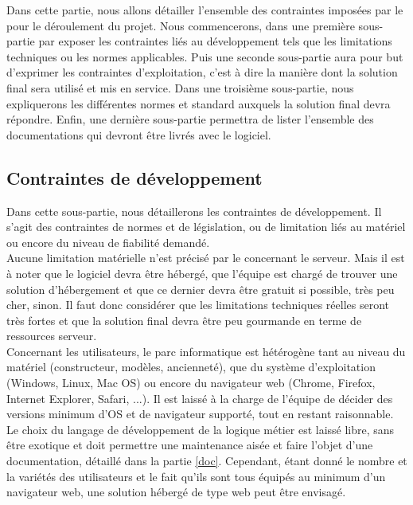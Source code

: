 Dans cette partie, nous allons détailler l'ensemble des contraintes imposées par le \client{} pour le déroulement du projet. Nous commencerons, dans une première sous-partie par exposer les contraintes liés au développement tels que les limitations techniques ou les normes applicables. Puis une seconde sous-partie aura pour but d'exprimer les contraintes d'exploitation, c'est à dire la manière dont la solution final sera utilisé et mis en service. Dans une troisième sous-partie, nous expliquerons les différentes normes et standard auxquels la solution final devra répondre. Enfin, une dernière sous-partie permettra de lister l'ensemble des documentations qui devront être livrés avec le logiciel.


\subsection{Contraintes de développement}
Dans cette sous-partie, nous détaillerons les contraintes de développement. Il s'agit des contraintes de normes et de législation, ou de limitation liés au matériel ou encore du niveau de fiabilité demandé.\\


Aucune limitation matérielle n'est précisé par le \client{} concernant le serveur. Mais il est à noter que le logiciel devra être hébergé, que l'équipe \PICCourt{} est chargé de trouver une solution d'hébergement et que ce dernier devra être gratuit si possible, très peu cher, sinon. Il faut donc considérer que les limitations techniques réelles seront très fortes et que la solution final devra être peu gourmande en terme de ressources serveur.\\

Concernant les utilisateurs, le parc informatique est hétérogène tant au niveau du matériel (constructeur, modèles, ancienneté), que du système d'exploitation (Windows, Linux, Mac OS) ou encore du navigateur web (Chrome, Firefox, Internet Explorer, Safari, ...). Il est laissé à la charge de l'équipe \PICCourt{} de décider des versions minimum d'OS et de navigateur supporté, tout en restant raisonnable.\\

Le choix du langage de développement de la logique métier est laissé libre, sans être exotique et doit permettre une maintenance aisée et faire l'objet d'une documentation, détaillé dans la partie \ref{doc}. Cependant, étant donné le nombre et la variétés des utilisateurs et le fait qu'ils sont tous équipés au minimum d'un navigateur web, une solution hébergé de type web peut être envisagé.\\

